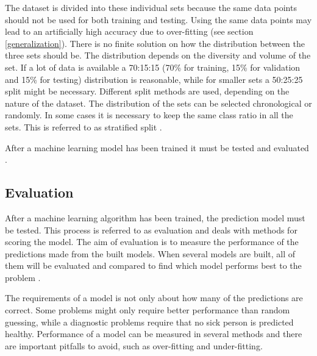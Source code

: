 \documentclass[english, a4paper]{report}
\begin{document}
{{{{\begin{itemize}
                \end{itemize}
                
                The dataset is divided into these individual sets because the same data points should not be used for both training and testing. Using the same data points may lead to an artificially high accuracy due to over-fitting (see section \ref{generalization}). There is no finite solution on how the distribution between the three sets should be. The distribution depends on the diversity and volume of the set. If a lot of data is available a 70:15:15 (70\% for training, 15\% for validation and 15\% for testing) distribution is reasonable, while for smaller sets a 50:25:25 split might be necessary. Different split methods are used, depending on the nature of the dataset. The distribution of the sets can be selected chronological or randomly. In some cases it is necessary to keep the same class ratio in all the sets. This is referred to as stratified split \cite{mlKelleher}. 
                \par
                After a machine learning model has been trained it must be tested and evaluated \cite{artificialIntelligence}.
            }
        }
        
        \subsection{Evaluation}\label{evaluation of algorithms}
        {   
            After a machine learning algorithm has been trained, the prediction model must be tested. This process is referred to as evaluation and deals with methods for scoring the model. The aim of evaluation is to measure the performance of the predictions made from the built models. When several models are built, all of them will be evaluated and compared to find which model performs best to the problem \cite{mlKelleher}.
            \par
            The requirements of a model is not only about how many of the predictions are correct. Some problems might only require better performance than random guessing, while a diagnostic problems require that no sick person is predicted healthy. Performance of a model can be measured in several methods and there are important pitfalls to avoid, such as over-fitting and under-fitting.  
        
}}}
\end{document}
